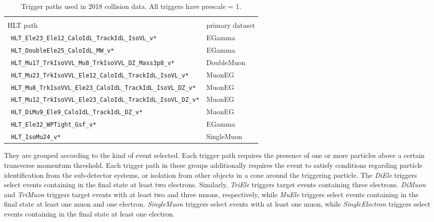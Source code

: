 \begin{table*}
  \caption{Trigger paths used in 2018 collision data. All triggers have prescale = 1.}
  \label{tab:triggerpaths2018}
  \scriptsize
  \centering
  \begin{tabular}{ l l }
    \toprule %
    \shortstack{{}\\[.15ex] \normalsize{HLT path}}                & \normalsize{primary dataset} \\
    \midrule %
    \verb| HLT_Ele23_Ele12_CaloIdL_TrackIdL_IsoVL_v*            | & EGamma \\
    \verb| HLT_DoubleEle25_CaloIdL_MW_v*                        | & EGamma \\
    \verb| HLT_Mu17_TrkIsoVVL_Mu8_TrkIsoVVL_DZ_Mass3p8_v*       | & DoubleMuon \\
    \verb| HLT_Mu23_TrkIsoVVL_Ele12_CaloIdL_TrackIdL_IsoVL_v*   | & MuonEG \\
    \verb| HLT_Mu8_TrkIsoVVL_Ele23_CaloIdL_TrackIdL_IsoVL_DZ_v* | & MuonEG \\
    \verb| HLT_Mu12_TrkIsoVVL_Ele23_CaloIdL_TrackIdL_IsoVL_DZ_v*| & MuonEG \\
    \verb| HLT_DiMu9_Ele9_CaloIdL_TrackIdL_DZ_v*                | & MuonEG \\
    \verb| HLT_Ele32_WPTight_Gsf_v*                             | & EGamma \\
    \verb| HLT_IsoMu24_v*                                       | & SingleMuon \\
    \bottomrule %
  \end{tabular}
\end{table*}

They are grouped according to the kind of event selected.
Each trigger path requires the presence of one or more particles above a certain transverse momentum threshold.
Each trigger path in these groups additionally requires the event to satisfy conditions regarding particle identification from the sub-detector systems,
or isolation from other objects in a cone around the triggering particle.
The \textit{DiEle} triggers select events containing in the final state at least two electrons.
Similarly, \textit{TriEle} triggers target events containing three electrons.
\textit{DiMuon} and \textit{TriMuon} triggers target events with at least two and three muons, respectively,
while \textit{MuEle} triggers select events containing in the final state at least one muon and one electron.
\textit{SingleMuon} triggers select events with at least one muon,
while \textit{SingleElectron} triggers select events containing in the final state at least one electron.
